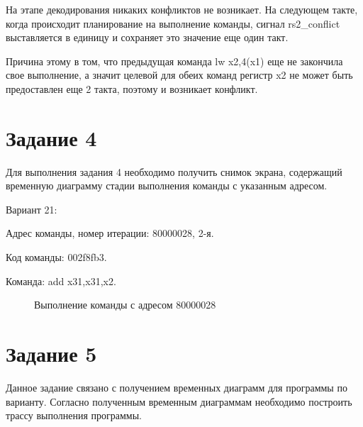 На этапе декодирования никаких конфликтов не возникает. 
На следую\-щем такте, когда происходит планирование на 
выполнение команды, сигнал rs2\_conflict выставляется в
единицу и сохраняет это значение еще один такт. 

Причина этому в том, что предыдущая команда lw x2,4(x1)
еще не закончила свое выполнение, а значит целевой для
обеих команд регистр x2 не может быть предоставлен еще
2 такта, поэтому и возникает конфликт.

\clearpage
\section{Задание 4}
Для выполнения задания 4 необходимо получить снимок экрана, содер\-жащий
временную диаграмму стадии выполнения команды с указанным
ад\-ресом.

Вариант 21:

\hspace{1cm} Адрес команды, номер итерации: 80000028, 2-я.
 
\hspace{1cm} Код команды: 002f8fb3.
 
\hspace{1cm} Команда: add x31,x31,x2.

\begin{figure}[ph!]
    \caption{Выполнение команды с адресом 80000028}
\end{figure}

\clearpage
\section{Задание 5}

Данное задание связано с получением временных диаграмм для 
про\-граммы по варианту. Согласно полученным временным диаграммам
необхо\-димо построить трассу выполнения программы.

